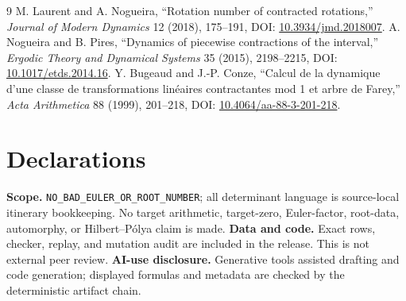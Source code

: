 \documentclass[10pt]{article}
\begin{document}
\begin{thebibliography}{9}
 M. Laurent and A. Nogueira, ``Rotation number of
contracted rotations,'' \emph{Journal of Modern Dynamics} 12 (2018),
175--191, DOI: \href{https://doi.org/10.3934/jmd.2018007}{10.3934/jmd.2018007}.
 A. Nogueira and B. Pires, ``Dynamics of piecewise
contractions of the interval,'' \emph{Ergodic Theory and Dynamical Systems}
35 (2015), 2198--2215, DOI:
\href{https://doi.org/10.1017/etds.2014.16}{10.1017/etds.2014.16}.
 Y. Bugeaud and J.-P. Conze, ``Calcul de la dynamique
d'une classe de transformations linéaires contractantes mod 1 et arbre de
Farey,'' \emph{Acta Arithmetica} 88 (1999), 201--218, DOI:
\href{https://doi.org/10.4064/aa-88-3-201-218}{10.4064/aa-88-3-201-218}.
\end{thebibliography}

\section*{Declarations}
\textbf{Scope.} \texttt{NO\_BAD\_EULER\_OR\_ROOT\_NUMBER}; all determinant
language is source-local itinerary bookkeeping.  No target arithmetic,
target-zero, Euler-factor, root-data, automorphy, or Hilbert--Pólya claim is
made.  \textbf{Data and code.} Exact rows, checker, replay, and mutation audit
are included in the release.  This is not external peer review.
\textbf{AI-use disclosure.} Generative tools assisted drafting and code
generation; displayed formulas and metadata are checked by the deterministic
artifact chain.
\end{document}
